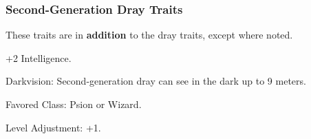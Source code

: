 \subsubsection{Second-Generation Dray Traits}
These traits are in \textbf{addition} to the dray traits, except where noted.
\begin{itemize*}
    \item +2 Intelligence.
    \item Darkvision: Second-generation dray can see in the dark up to 9 meters.
    \item Favored Class: Psion or Wizard.
    \item Level Adjustment: +1.
\end{itemize*}
